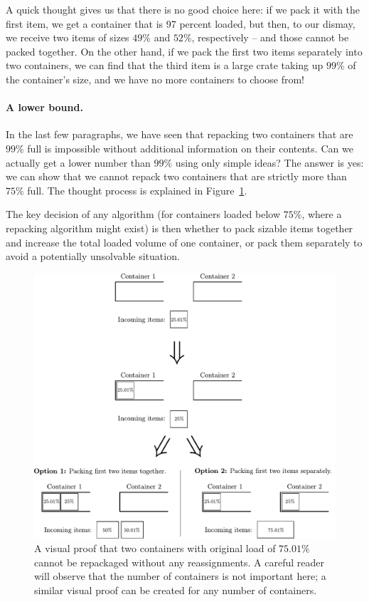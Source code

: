 A quick thought gives us that there is no good choice here: if we pack
it with the first item, we get a container that is 97 percent loaded,
but then, to our dismay, we receive two items of sizes $49\%$ and
$52\%$, respectively -- and those cannot be packed together. On the
other hand, if we pack the first two items separately into two
containers, we can find that the third item is a large crate taking up
$99\%$ of the container's size, and we have no more containers to
choose from!

\paragraph{A lower bound.} In the last few paragraphs, we have seen
that repacking two containers that are $99\%$ full is impossible
without additional information on their contents. Can we actually get
a lower number than $99\%$ using only simple ideas? The answer is yes:
we can show that we cannot repack two containers that are strictly
more than $75\%$ full. The thought process is explained in Figure~\ref{fig:example-lowerbound}.

The key decision of any algorithm (for containers loaded below $75\%$,
where a repacking algorithm might exist) is then whether to pack
sizable items together and increase the total loaded volume of one
container, or pack them separately to avoid a potentially unsolvable
situation.

\begin{figure}[th]
\begin{center}
\includegraphics[width=\textwidth]{img/example-lowerbound.pdf}
\end{center}
\caption[A visual proof that two containers with original load of $75.01\%$ cannot
be repackaged without any reassignments.]{A visual proof that two containers with original load of $75.01\%$ cannot
be repackaged without any reassignments. A careful reader will observe that the number
of containers is not important here; a similar visual proof can be created for any
number of containers.}
\label{fig:example-lowerbound}
\end{figure}


